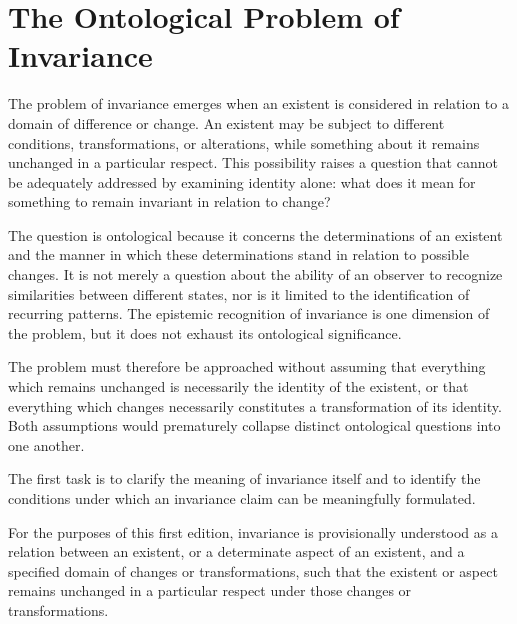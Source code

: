

\section{The Ontological Problem of Invariance}
\label{sec:ontological-problem-of-invariance}


The problem of invariance emerges when an existent is
considered in relation to a domain of difference or change.
An existent may be subject to different conditions,
transformations, or alterations, while something about it
remains unchanged in a particular respect. This possibility
raises a question that cannot be adequately addressed by
examining identity alone: what does it mean for something
to remain invariant in relation to change?

The question is ontological because it concerns the
determinations of an existent and the manner in which
these determinations stand in relation to possible changes.
It is not merely a question about the ability of an observer
to recognize similarities between different states, nor is
it limited to the identification of recurring patterns.
The epistemic recognition of invariance is one dimension
of the problem, but it does not exhaust its ontological
significance.

The problem must therefore be approached without assuming
that everything which remains unchanged is necessarily
the identity of the existent, or that everything which
changes necessarily constitutes a transformation of its
identity. Both assumptions would prematurely collapse
distinct ontological questions into one another.

The first task is to clarify the meaning of invariance
itself and to identify the conditions under which an
invariance claim can be meaningfully formulated.


For the purposes of this first edition, invariance is
provisionally understood as a relation between an existent,
or a determinate aspect of an existent, and a specified
domain of changes or transformations, such that the
existent or aspect remains unchanged in a particular
respect under those changes or transformations.

